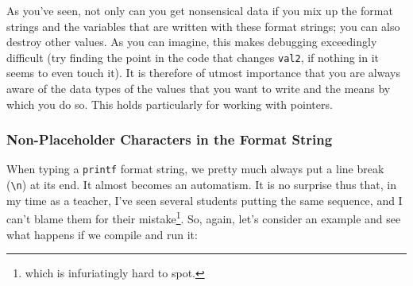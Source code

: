 {\begin{defbox}
\begin{center}
\end{center}
\end{defbox}

\begin{hintbox}
As you've seen, not only can you get nonsensical data if you mix up the format strings and the variables that are written with these format strings; you can also destroy other values. As you can imagine, this makes debugging exceedingly difficult (try finding the point in the code that changes \texttt{val2}, if nothing in it seems to even touch it). It is therefore of utmost importance that you are always aware of the data types of the values that you want to write and the means by which you do so. This holds particularly for working with pointers.
\end{hintbox}

\subsubsection{Non-Placeholder Characters in the Format String}
When typing a \texttt{printf} format string, we pretty much always put a line break (\texttt{\textbackslash n}) at its end. It almost becomes an automatism. It is no surprise thus that, in my time as a teacher, I've seen several students putting the same sequence, and I can't blame them for their mistake\footnote{which is infuriatingly hard to spot.}. So, again, let's consider an example and see what happens if we compile and run it:

}
